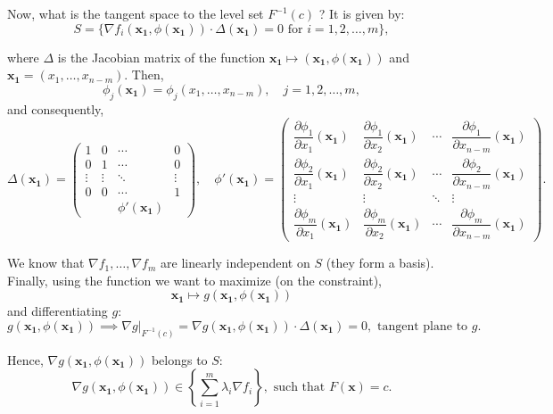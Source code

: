 \documentclass[11pt]{article}
\begin{document}
Now, what is the tangent space to the level set \(F^{-1}(c)\) ? It is given by:
\[S = \{\nabla f_i(\mathbf{x_1}, \phi(\mathbf{x_1})) \cdot \Delta(\mathbf{x_1}) = 0 \text{ for } i = 1, 2, \dots, m\},\]

where \(\Delta\) is the Jacobian matrix of the function \(\mathbf{x_1} \mapsto (\mathbf{x_1}, \phi(\mathbf{x_1}))\) and \(\mathbf{x_1} = (x_1, \dots, x_{n-m})\). Then,
\[\phi_j(\mathbf{x_1}) = \phi_j(x_1, \dots, x_{n-m}), \quad j = 1, 2, \dots, m,\]
and consequently,
\[\Delta(\mathbf{x_1}) = \begin{pmatrix}
1 & 0 & \cdots & 0 \\
0 & 1 & \cdots & 0 \\
\vdots & \vdots & \ddots & \vdots \\
0 & 0 & \cdots & 1 \\
& & \phi'(\mathbf{x_1}) &
\end{pmatrix},  \quad \phi'(\mathbf{x_1}) = \begin{pmatrix}
\dfrac{\partial \phi_1}{\partial x_1}(\mathbf{x_1}) & \dfrac{\partial \phi_1}{\partial x_2}(\mathbf{x_1}) & \cdots & \dfrac{\partial \phi_1}{\partial x_{n-m}}(\mathbf{x_1}) \\
\dfrac{\partial \phi_2}{\partial x_1}(\mathbf{x_1}) & \dfrac{\partial \phi_2}{\partial x_2}(\mathbf{x_1}) & \cdots & \dfrac{\partial \phi_2}{\partial x_{n-m}}(\mathbf{x_1}) \\
\vdots & \vdots & \ddots & \vdots \\
\dfrac{\partial \phi_m}{\partial x_1}(\mathbf{x_1}) & \dfrac{\partial \phi_m}{\partial x_2}(\mathbf{x_1}) & \cdots & \dfrac{\partial \phi_m}{\partial x_{n-m}}(\mathbf{x_1})
\end{pmatrix}
.\]

We know that \(\nabla f_1, \dots, \nabla f_m\) are linearly independent on \(S\) (they form a basis). Finally, using the function we want to maximize (on the constraint),
\[\mathbf{x_1} \mapsto g(\mathbf{x_1}, \phi(\mathbf{x_1}))\]
and differentiating \(g\):
\[g(\mathbf{x_1}, \phi(\mathbf{x_1})) \implies \nabla g\big|_{F^{-1}(c)} = \nabla g(\mathbf{x_1}, \phi(\mathbf{x_1})) \cdot \Delta(\mathbf{x_1}) = 0, \text{ tangent plane to } g.\]

Hence, \(\nabla g(\mathbf{x_1}, \phi(\mathbf{x_1}))\) belongs to \(S\):
\[\nabla g(\mathbf{x_1}, \phi(\mathbf{x_1})) \in \left\{\sum_{i=1}^m \lambda_i \nabla f_i \right\}, \text{ such that } F(\mathbf{x}) = c.\]

\pagebreak
\end{document}
